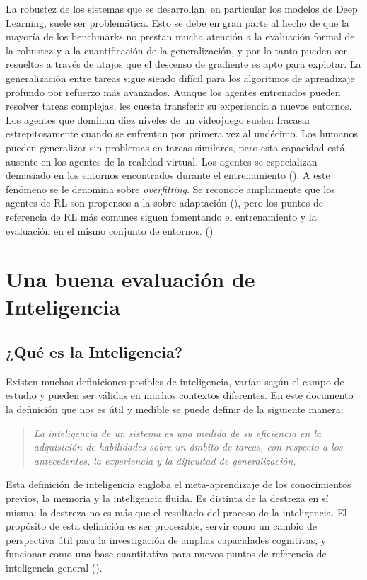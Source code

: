 La robustez de los sistemas que se desarrollan, en particular los modelos de Deep Learning, suele ser problemática. Esto se debe en gran parte al hecho de que la mayoría de los benchmarks no prestan mucha atención a la evaluación formal de la robustez y a la cuantificación de la generalización, y por lo tanto pueden ser resueltos a través de atajos que el descenso de gradiente es apto para explotar. La generalización entre tareas sigue siendo difícil para los algoritmos de aprendizaje profundo por refuerzo más avanzados. Aunque los agentes entrenados pueden resolver tareas complejas, les cuesta transferir su experiencia a nuevos entornos. Los agentes que dominan diez niveles de un videojuego suelen fracasar estrepitosamente cuando se enfrentan por primera vez al undécimo. Los humanos pueden generalizar sin problemas en tareas similares, pero esta capacidad está ausente en los agentes de la realidad virtual. Los agentes se especializan demasiado en los entornos encontrados durante el entrenamiento (\cite{cobbe2019quantifying}). A este fenómeno se le denomina sobre \textit{overfitting}. Se reconoce ampliamente que los agentes de RL son propensos a la sobre adaptación (\cite{zhang2018study}), pero los puntos de referencia de RL más comunes siguen fomentando el entrenamiento y la evaluación en el mismo conjunto de entornos. (\cite{nichol2018gotta}) 

\section{Una buena evaluación de Inteligencia}\label{section:state-of-the-art:a-good-measure-of-inteligence}

\subsection{¿Qué es la Inteligencia?}
Existen muchas definiciones posibles de inteligencia, varían según el campo de estudio y pueden ser válidas en muchos contextos diferentes. En este documento la definición que nos es útil y medible se puede definir de la siguiente manera:

\begin{quote}
   \textit{ La inteligencia de un sistema es una medida de su eficiencia en la adquisición de habilidades sobre un ámbito de tareas, con respecto a los antecedentes, la experiencia y la dificultad de generalización.}
\end{quote}

Esta definición de inteligencia engloba el meta-aprendizaje de los conocimientos previos, la memoria y la inteligencia fluida. Es distinta de la destreza en sí misma: la destreza no es más que el resultado del proceso de la inteligencia. El propósito de esta definición es ser procesable, servir como un cambio de perspectiva útil para la investigación de amplias capacidades cognitivas, y funcionar como una base cuantitativa para nuevos puntos de referencia de inteligencia general (\cite{chollet2019measure}).

